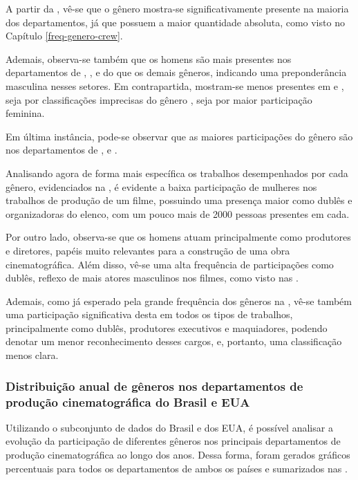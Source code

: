 A partir da , vê-se que o gênero  mostra-se significativamente presente na maioria dos departamentos, já que possuem a maior quantidade absoluta, como visto no Capítulo \ref{freq-genero-crew}. 

Ademais, observa-se também que os homens são mais presentes nos departamentos de , ,  e  do que os demais gêneros, indicando uma preponderância masculina nesses setores. Em contrapartida, mostram-se menos presentes em  e , seja por classificações imprecisas do gênero , seja por maior participação feminina.

Em última instância, pode-se observar que as maiores participações do gênero  são nos departamentos de ,  e .

%

Analisando agora de forma mais específica os trabalhos desempenhados por cada gênero, evidenciados na , é evidente a baixa participação de mulheres nos trabalhos de produção de um filme, possuindo uma presença maior como dublês e organizadoras do elenco, com um pouco mais de 2000 pessoas presentes em cada.

Por outro lado, observa-se que os homens atuam principalmente como produtores e diretores, papéis muito relevantes para a construção de uma obra cinematográfica\cite{studiobinderProducerDirector}. Além disso, vê-se uma alta frequência de participações como dublês, reflexo de mais atores masculinos nos filmes, como visto nas .

Ademais, como já esperado pela grande frequência dos gêneros  na , vê-se também uma participação significativa desta em todos os tipos de trabalhos, principalmente como dublês, produtores executivos e maquiadores, podendo denotar um menor reconhecimento desses cargos, e, portanto, uma classificação menos clara.

\subsubsection{Distribuição anual de gêneros nos departamentos de produção cinematográfica do Brasil e EUA}
Utilizando o subconjunto de dados do Brasil e dos EUA, é possível analisar a evolução da participação de diferentes gêneros nos principais departamentos de produção cinematográfica ao longo dos anos. Dessa forma, foram gerados gráficos percentuais para todos os departamentos de ambos os países e sumarizados nas .

